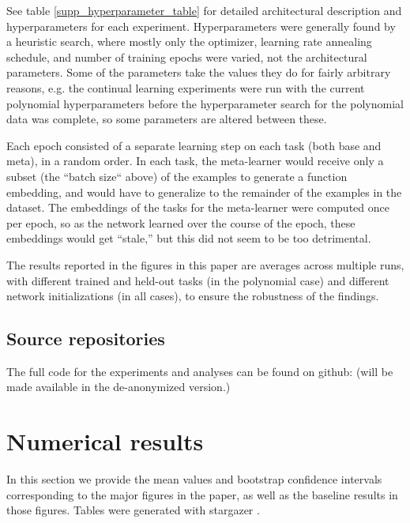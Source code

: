 See table \ref{supp_hyperparameter_table} for detailed architectural description and hyperparameters for each experiment. Hyperparameters were generally found by a heuristic search, where mostly only the optimizer, learning rate annealing schedule, and number of training epochs were varied, not the architectural parameters. Some of the parameters take the values they do for fairly arbitrary reasons, e.g. the continual learning experiments were run with the current polynomial hyperparameters before the hyperparameter search for the polynomial data was complete, so some parameters are altered between these. \par
Each epoch consisted of a separate learning step on each task (both base and meta), in a random order. In each task, the meta-learner would receive only a subset (the ``batch size`` above) of the examples to generate a function embedding, and would have to generalize to the remainder of the examples in the dataset. The embeddings of the tasks for the meta-learner were computed once per epoch, so as the network learned over the course of the epoch, these embeddings would get ``stale,'' but this did not seem to be too detrimental. \par 
The results reported in the figures in this paper are averages across multiple runs, with different trained and held-out tasks (in the polynomial case) and different network initializations (in all cases), to ensure the robustness of the findings. \par 

\subsection{Source repositories}
The full code for the experiments and analyses can be found on github:
(will be made available in the de-anonymized version.)
\section{Numerical results} \label{app_numerical_results}
In this section we provide the mean values and bootstrap confidence intervals corresponding to the major figures in the paper, as well as the baseline results in those figures. Tables were generated with stargazer \citep{Hlavac2018}. \par

